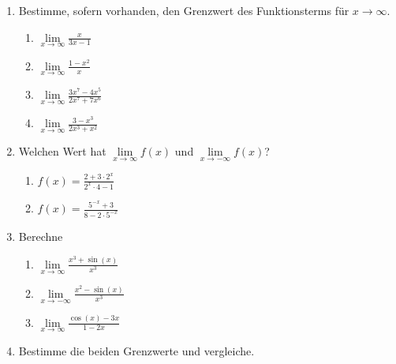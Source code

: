 \begin{ueb}
    {}{}
   \begin{enumerate}
    \item Bestimme, sofern vorhanden, den Grenzwert des Funktionsterms für $x \to \infty$.

    \begin{enumerate}
        \item $\lim\limits_{x \to \infty} \frac{x}{3x - 1}$
        \item $\lim\limits_{x \to \infty} \frac{1 - x^2}{x}$
        \item $\lim\limits_{x \to \infty} \frac{3x^7 - 4x^5}{2x^7 + 7x^6}$
        \item $\lim\limits_{x \to \infty} \frac{3 - x^3}{2x^3 + x^2}$
    \end{enumerate}
\item Welchen Wert hat $\lim\limits_{x \to \infty} f(x)$ und $\lim\limits_{x \to -\infty} f(x)$?

\begin{enumerate}
    \item $f(x) = \frac{2 + 3 \cdot 2^x}{2^x \cdot 4 - 1}$
    \item $f(x) = \frac{5^{-x} + 3}{8 - 2 \cdot 5^{-x}}$
\end{enumerate}

\item 
Berechne

\begin{enumerate}
    \item $\lim\limits_{x \to \infty} \frac{x^3 + \sin(x)}{x^3}$
    \item $\lim\limits_{x \to -\infty} \frac{x^2 - \sin(x)}{x^3}$
    \item $\lim\limits_{x \to \infty} \frac{\cos(x) - 3x}{1 - 2x}$
\end{enumerate}    
\item Bestimme die beiden Grenzwerte und vergleiche.


\end{enumerate}
\end{ueb}
